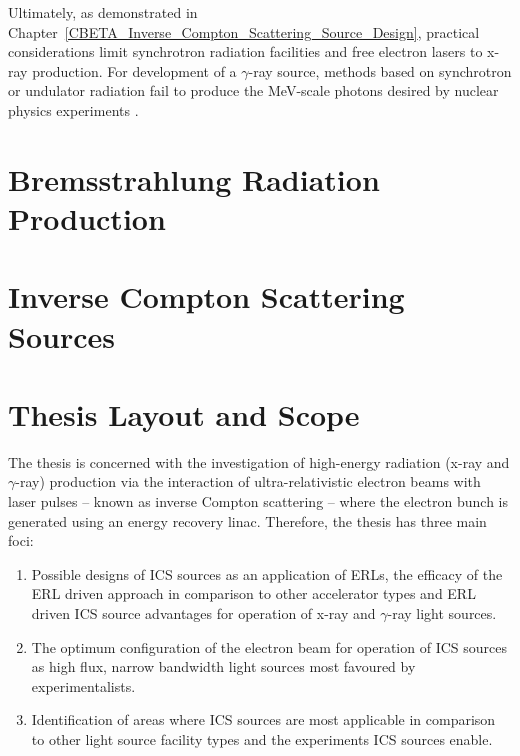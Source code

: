 \documentclass[../main.tex]{subfiles}
\begin{document}
Ultimately, as demonstrated in Chapter~\ref{CBETA_Inverse_Compton_Scattering_Source_Design}, practical considerations limit synchrotron radiation facilities and free electron lasers to x-ray production. For development of a $\gamma$-ray source, methods based on synchrotron or undulator radiation fail to produce the \si{\mega\electronvolt}-scale photons desired by nuclear physics experiments \cite{}.  

\section{Bremsstrahlung Radiation Production}
\label{sec:bremsstrahlung}

\section{Inverse Compton Scattering Sources}

\section{Thesis Layout and Scope}

The thesis is concerned with the investigation of high-energy radiation (x-ray and $\gamma$-ray) production via the interaction of ultra-relativistic electron beams with laser pulses -- known as inverse Compton scattering -- where the electron bunch is generated using an energy recovery linac. Therefore, the thesis has three main foci: 
\begin{enumerate}
    \item{Possible designs of ICS sources as an application of ERLs, the efficacy of the ERL driven approach in comparison to other accelerator types and ERL driven ICS source advantages for operation of x-ray and $\gamma$-ray light sources.}
    \item{The optimum configuration of the electron beam for operation of ICS sources as high flux, narrow bandwidth light sources most favoured by experimentalists.}
    \item{Identification of areas where ICS sources are most applicable in comparison to other light source facility types and the experiments ICS sources enable.}
\end{enumerate}
\end{document}
